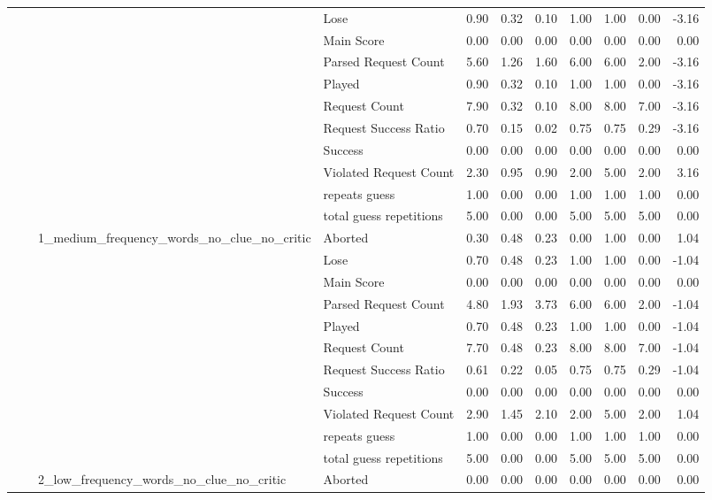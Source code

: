 \begin{tabular}{llllrrrrrrr}
 &  &  & Lose & 0.90 & 0.32 & 0.10 & 1.00 & 1.00 & 0.00 & -3.16 \\
 &  &  & Main Score & 0.00 & 0.00 & 0.00 & 0.00 & 0.00 & 0.00 & 0.00 \\
 &  &  & Parsed Request Count & 5.60 & 1.26 & 1.60 & 6.00 & 6.00 & 2.00 & -3.16 \\
 &  &  & Played & 0.90 & 0.32 & 0.10 & 1.00 & 1.00 & 0.00 & -3.16 \\
 &  &  & Request Count & 7.90 & 0.32 & 0.10 & 8.00 & 8.00 & 7.00 & -3.16 \\
 &  &  & Request Success Ratio & 0.70 & 0.15 & 0.02 & 0.75 & 0.75 & 0.29 & -3.16 \\
 &  &  & Success & 0.00 & 0.00 & 0.00 & 0.00 & 0.00 & 0.00 & 0.00 \\
 &  &  & Violated Request Count & 2.30 & 0.95 & 0.90 & 2.00 & 5.00 & 2.00 & 3.16 \\
 &  &  & repeats guess & 1.00 & 0.00 & 0.00 & 1.00 & 1.00 & 1.00 & 0.00 \\
 &  &  & total guess repetitions & 5.00 & 0.00 & 0.00 & 5.00 & 5.00 & 5.00 & 0.00 \\
\cline{3-11}
 &  & \multirow[t]{11}{*}{1_medium_frequency_words_no_clue_no_critic} & Aborted & 0.30 & 0.48 & 0.23 & 0.00 & 1.00 & 0.00 & 1.04 \\
 &  &  & Lose & 0.70 & 0.48 & 0.23 & 1.00 & 1.00 & 0.00 & -1.04 \\
 &  &  & Main Score & 0.00 & 0.00 & 0.00 & 0.00 & 0.00 & 0.00 & 0.00 \\
 &  &  & Parsed Request Count & 4.80 & 1.93 & 3.73 & 6.00 & 6.00 & 2.00 & -1.04 \\
 &  &  & Played & 0.70 & 0.48 & 0.23 & 1.00 & 1.00 & 0.00 & -1.04 \\
 &  &  & Request Count & 7.70 & 0.48 & 0.23 & 8.00 & 8.00 & 7.00 & -1.04 \\
 &  &  & Request Success Ratio & 0.61 & 0.22 & 0.05 & 0.75 & 0.75 & 0.29 & -1.04 \\
 &  &  & Success & 0.00 & 0.00 & 0.00 & 0.00 & 0.00 & 0.00 & 0.00 \\
 &  &  & Violated Request Count & 2.90 & 1.45 & 2.10 & 2.00 & 5.00 & 2.00 & 1.04 \\
 &  &  & repeats guess & 1.00 & 0.00 & 0.00 & 1.00 & 1.00 & 1.00 & 0.00 \\
 &  &  & total guess repetitions & 5.00 & 0.00 & 0.00 & 5.00 & 5.00 & 5.00 & 0.00 \\
\cline{3-11}
 &  & \multirow[t]{11}{*}{2_low_frequency_words_no_clue_no_critic} & Aborted & 0.00 & 0.00 & 0.00 & 0.00 & 0.00 & 0.00 & 0.00 \\

\end{tabular}
